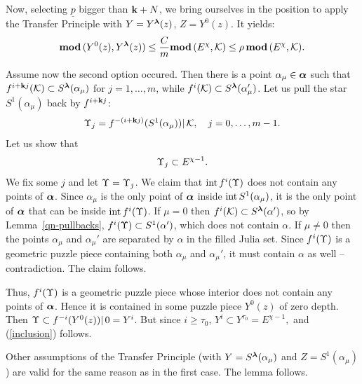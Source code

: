 \begin{pf}
Now,  selecting $\underline{p}$ bigger than ${\mathbf{k}}+N$,
we bring ourselves in the position to apply the Transfer Principle
with $Y=Y^{\boldsymbol{\lambda}}(z)$, $Z=Y^0(z)$. 
It yields:
$$
   { \mathbf{mod}\, }(Y^0(z), Y^{{\boldsymbol{\lambda}}}(z) ) \leq \frac{C}{m} { \mathbf{mod}\, }(E^\chi, {\mathcal K})\leq \rho\,  { \mathbf{mod}\, }(E^\chi, {\mathcal K}).
$$

\msk Assume now the second option occured.
Then there is a point $\alpha_\mu\in {\mbox{\boldmath$\alpha$} }$ such that  
$f^{i+{\mathbf{k}} j}({\mathcal K})\subset S^{\boldsymbol{\lambda}}(\alpha_\mu)$ for  $j=1,\dots, m$,
while $f^{i}({\mathcal K})\subset S^{\boldsymbol{\lambda}}(\alpha_\mu')$.
Let us pull the star $S^1(\alpha_\mu)$ back by $f^{i+{\mathbf{k}} j}$:   
$$
  {\Upsilon}_j= f^{-(i+{\mathbf{k}} j)}(S^1(\alpha_\mu))|\, {\mathcal K},\quad  j=0,\dots, m-1.
$$ 
Let us show that 
\begin{equation}\label{inclusion}
   {\Upsilon}_j\subset E^{\chi-1}. 
\end{equation}
We fix some $j$ and let ${\Upsilon}={\Upsilon}_j$. 
%     
We claim  that $\operatorname{int} f^i({\Upsilon})$ does not contain any points of ${\mbox{\boldmath$\alpha$} }$. 
Since $\alpha_{\mu}$ is the only point of ${\mbox{\boldmath$\alpha$} }$  inside $\operatorname{int} S^1(\alpha_\mu)$, 
it is the only point of ${\mbox{\boldmath$\alpha$} }$ that can be inside $\operatorname{int} f^i({\Upsilon})$. 
If $\mu=0$ then $f^i ({\mathcal K})\subset S^{\boldsymbol{\lambda}}(\alpha')$, 
so by Lemma~\ref{qn-pullbacks}, %
$f^i({\Upsilon}) \subset S^1(\alpha')$, 
which does not contain $\alpha$. 
If $\mu\not=0$ then the points $\alpha_\mu$ and $\alpha_\mu'$ are separated by $\alpha$
in the filled Julia set. Since $f^i({\Upsilon})$ is a geometric puzzle piece containing both 
$\alpha_\mu$ and $\alpha_\mu'$, it must contain $\alpha$ as well --  contradiction.  
The claim follows.

Thus,  $f^i({\Upsilon})$ is a geometric puzzle piece whose interior does not contain any points of ${\mbox{\boldmath$\alpha$} }$.
Hence it is contained in some puzzle piece $Y^0(z)$ of zero depth. 
Then ${\Upsilon} \subset f^{-i}(Y^0(z))|\, 0=Y^i$.
But since $i \geq \tau_0$,  
$
   Y^i  \subset Y^{\tau_0} =  E^{\chi-1},
$
and (\ref{inclusion}) follows. 

Other assumptions of the Transfer Principle 
(with $Y=S^{\boldsymbol{\lambda}}(\alpha_\mu)$  and $Z=S^1(\alpha_\mu)$) 
are valid for the same reason as in the first case.
The lemma follows.
\end{pf}


